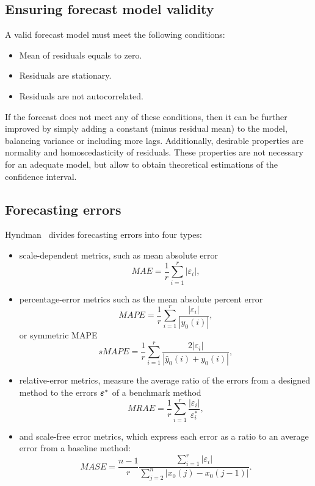 \documentclass[12pt]{article}
\begin{document}
\subsection{Ensuring forecast model validity}
A valid forecast model must meet the following conditions:
\begin{itemize}
\item Mean of residuals equals to zero.
\item Residuals are stationary.
\item Residuals are not autocorrelated.
\end{itemize}
If the forecast does not meet any of these conditions, then it can be further improved by
 simply adding a constant (minus residual mean) to the model, balancing variance or including more lags. Additionally, desirable properties are normality and homoscedasticity of residuals. These properties are not necessary for an adequate model, but allow to obtain theoretical estimations of the confidence interval.

\subsection{Forecasting errors}
Hyndman~\cite{Hyndman2006} divides forecasting errors into four types:
\begin{itemize}
\item scale-dependent metrics, such as mean
absolute error
\[ MAE = \frac{1}{r}\sum_{i = 1}^{r} |\varepsilon_i|,\]
\item percentage-error metrics such as the mean absolute percent error
\[ MAPE = \frac{1}{r}\sum_{i = 1}^{r} \frac{|\varepsilon_i|}{|y_{0}(i)|}, \]
or symmetric MAPE
\[ sMAPE = \frac{1}{r}\sum_{i = 1}^{r} \frac{2|{\varepsilon}_i|}{|\hat{y}_0(i) + y_{0}(i)|}, \] \item relative-error metrics, measure
the average ratio of the errors from a designed
method to the errors ${\boldsymbol{\varepsilon}}^{*}$ of a benchmark method
 \[ MRAE = \frac{1}{r}\sum_{i = 1}^{r} \frac{|{\varepsilon}_i|}{{\varepsilon}^{*}_i},\]
\item and
scale-free error metrics, which express each
error as a ratio to an average error from a
baseline method:
\[ MASE = \frac{n-1}{r}\frac{\sum_{i=1}^r|\varepsilon_i|}{\sum_{j=2}^n |x_0(j) - x_0(j-1)|}. \]
\end{itemize}

\nocite{*}


\end{document}
